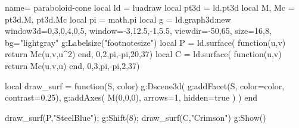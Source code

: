 \documentclass[border=5pt]{standalone}%
\begin{document}
\begin{luadraw}{name= paraboloid-cone}
local ld = luadraw
local pt3d = ld.pt3d
local M, Mc = pt3d.M, pt3d.Mc
local pi = math.pi
local g = ld.graph3d:new{ window3d={0,3,0,4,0,5}, window={-3,12.5,-1,5.5}, 
    viewdir={-50,65}, size={16,8}, bg="lightgray"}
g:Labelsize("footnotesize")
local P = ld.surface( function(u,v) return Mc(u,v,u^2) end, 0,2,pi,-pi,{20,37})
local C = ld.surface( function(u,v) return Mc(u,v,u) end, 0,3,pi,-pi,{2,37})

local draw_surf = function(S, color)
    g:Dscene3d( 
        g:addFacet(S, {color=color, contrast=0.25}),
        g:addAxes( M(0,0,0), {arrows=1, hidden=true} ) )
end

draw_surf(P,"SteelBlue"); g:Shift(8); draw_surf(C,"Crimson")
g:Show() 
\end{luadraw}
\end{document}
